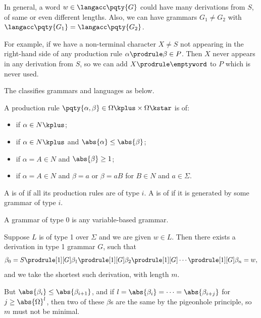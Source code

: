 \begin{remark}
    In general, a word \(w \in \langacc\pqty{G}\) could have many derivations from \(S\), of same or even different lengths. Also, we can have grammars \(G_1 \neq G_2\) with \(\langacc\pqty{G_1} = \langacc\pqty{G_2}\).

    For example, if we have a non-terminal character \(X \neq S\) not appearing in the right-hand side of any production rule \(\alpha \prodrule \beta \in P\). Then \(X\) never appears in any derivation from \(S\), so we can add \(X \prodrule \emptyword\) to \(P\) which is never used.
\end{remark}

The  classifies grammars and languages as below.

\begin{definition}
    A production rule \(\pqty{\alpha, \beta} \in \Omega\kplus \times \Omega\kstar\) is of:
    \begin{itemize}
        \item {} if \(\alpha \in N\kplus\);
        \item {} if \(\alpha \in N\kplus\) and \(\abs{\alpha} \leq \abs{\beta}\);
        \item {} if \(\alpha = A \in N\) and \(\abs{\beta} \geq 1\);
        \item {} if \(\alpha = A \in N\) and \(\beta = a\) or \(\beta = aB\) for \(B \in N\) and \(a \in \Sigma\).
    \end{itemize}

    A  is of  if all its production rules are of type \(i\). A  is of  if it is generated by some grammar of type \(i\).
\end{definition}

\begin{remark}
    A grammar of type 0 is any variable-based grammar.
\end{remark}

Suppose \(L\) is of type 1 over \(\Sigma\) and we are given \(w \in L\). Then there exists a derivation in type 1 grammar \(G\), such that
\[
    \beta_0 = S \prodrule[1][G] \beta_1 \prodrule[1][G] \beta_2 \prodrule[1][G] \cdots \prodrule[1][G] \beta_n = w,
\]
and we take the shortest such derivation, with length \(m\).

But \(\abs{\beta_i} \leq \abs{\beta_{i + 1}}\), and if \(l = \abs{\beta_i} = \cdots = \abs{\beta_{i + j}}\) for \(j \geq \abs{\Omega}^l\), then two of these \(\beta\)s are the same by the pigeonhole principle, so \(m\) must not be minimal.

